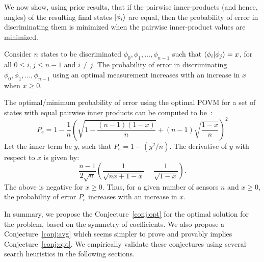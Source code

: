 We now show, using prior results, that 
if the pairwise inner-products (and hence, angles) 
of the resulting final states $\ket{\phi_i}$ are equal, then the 
probability of error in discriminating them 
is minimized when the pairwise inner-product values are minimized. 

\begin{lem-prf}
Consider $n$ states to be discriminated $\phi_0, \phi_1, \ldots, \phi_{n-1}$ 
such that $\bra{\phi_i}\ket{\phi_j} = x$,
for all $0 \leq i, j \leq n-1$ and $i \neq j$. 
The probability of error in discriminating 
$\phi_0, \phi_1, \ldots, \phi_{n-1}$ using an optimal measurement 
increases with an increase in $x$ when $x \geq 0$.
\label{lemma:angle}
\end{lem-prf}
\begin{prf}
The optimal/minimum probability of error using the optimal POVM for a set of states with equal pairwise inner products can be computed to be~\cite{quantum_pyramid}:
$$P_e = 1- \frac{1}{n}\left(\sqrt{1-\frac{(n-1)(1-x)}{n}} + (n-1)\sqrt{\frac{1-x}{n}}\right)^2$$
Let the inner term be $y$, such that $P_e = 1 - (y^2/n)$. The derivative of $y$ with respect to $x$ is given by:
$$ \frac{n-1}{2\sqrt{n}}\left(\frac{1}{\sqrt{nx+1-x}} - \frac{1}{\sqrt{1-x}}\right).$$
The above is negative for $x \geq 0$. Thus, for a given number of sensors $n$ and $x \geq 0$, the probability of error $P_e$ increases with an increase in $x$.
\end{prf}

In summary, we propose the Conjecture~\ref{conj:opt} for the optimal solution for the \iso problem, based on the symmetry of coefficients. 
We also propose a Conjecture~\ref{conj:avg} which seems simpler to prove and provably implies Conjecture~\ref{conj:opt}. 
We empirically validate these conjectures using several search heuristics in the following sections.  
